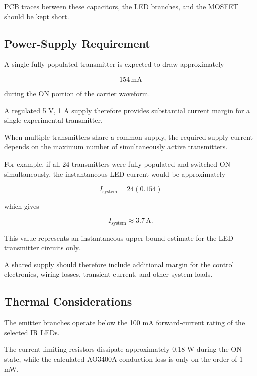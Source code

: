 \documentclass[a4paper,12pt]{article}
\begin{document}
PCB traces between these capacitors, the LED branches, and the MOSFET
should be kept short.



\subsection{Power-Supply Requirement}

A single fully populated transmitter is expected to draw approximately

\[
154\,\text{mA}
\]

during the ON portion of the carrier waveform.

A regulated 5 V, 1 A supply therefore provides substantial current
margin for a single experimental transmitter.

When multiple transmitters share a common supply, the required supply
current depends on the maximum number of simultaneously active
transmitters.

For example, if all 24 transmitters were fully populated and switched
ON simultaneously, the instantaneous LED current would be approximately

\[
I_{\text{system}}
=
24(0.154)
\]

which gives

\[
I_{\text{system}}
\approx
3.7\,\text{A}.
\]

This value represents an instantaneous upper-bound estimate for the
LED transmitter circuits only.

A shared supply should therefore include additional margin for the
control electronics, wiring losses, transient current, and other system
loads.



\subsection{Thermal Considerations}

The emitter branches operate below the 100 mA forward-current rating of
the selected IR LEDs.

The current-limiting resistors dissipate approximately 0.18 W during
the ON state, while the calculated AO3400A conduction loss is only on
the order of 1 mW.
\end{document}
